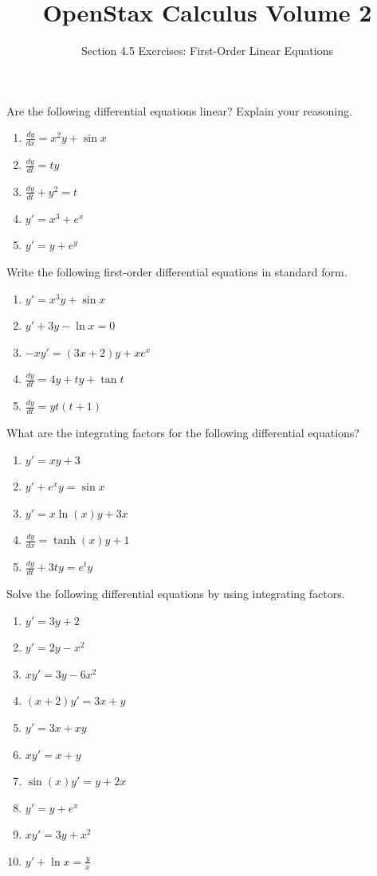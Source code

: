 \documentclass{exercises}
\title{OpenStax Calculus Volume 2}
\subtitle{Section 4.5 Exercises: First-Order Linear Equations}
\author{}
\date{}
\begin{document}
\maketitle


Are the following differential equations linear? Explain your reasoning.

\begin{enumerate}[start=1]
\item $\frac{dy}{dx}=x^{2}y+\sin x$
\item $\frac{dy}{dt}=ty$
\item $\frac{dy}{dt}+y^{2}=t$
\item $y'=x^{3}+e^{x}$
\item $y'=y+e^{y}$
\end{enumerate}

Write the following first-order differential equations in standard form.

\begin{enumerate}[resume]
\item $y'=x^{3}y+\sin x$
\item $y'+3y-\ln x=0$
\item $-xy'=(3x+2)y+xe^{x}$
\item $\frac{dy}{dt}=4y+ty+\tan t$
\item $\frac{dy}{dt}=yt(t+1)$
\end{enumerate}

What are the integrating factors for the following differential equations?

\begin{enumerate}[resume]
\item $y'=xy+3$
\item $y'+e^{x}y=\sin x$
\item $y'=x\ln(x)y+3x$
\item $\frac{dy}{dx}=\tanh(x)y+1$
\item $\frac{dy}{dt}+3ty=e^{t}y$
\end{enumerate}

Solve the following differential equations by using integrating factors.

\begin{enumerate}[resume]
\item $y'=3y+2$
\item $y'=2y-x^{2}$
\item $xy'=3y-6x^{2}$
\item $(x+2)y'=3x+y$
\item $y'=3x+xy$
\item $xy'=x+y$
\item $\sin(x)y'=y+2x$
\item $y'=y+e^{x}$
\item $xy'=3y+x^{2}$
\item $y'+\ln x=\frac{y}{x}$
\end{enumerate}
\end{document}

